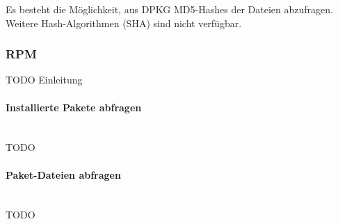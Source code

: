 \noindent Es besteht die Möglichkeit, aus DPKG MD5-Hashes der Dateien abzufragen. Weitere
Hash-Algorithmen (\zb SHA) sind nicht verfügbar.


\subsubsection{RPM}

TODO Einleitung

\paragraph{Installierte Pakete abfragen} \hspace{0pt} \\

\noindent TODO

\paragraph{Paket-Dateien abfragen} \hspace{0pt} \\

\noindent TODO
